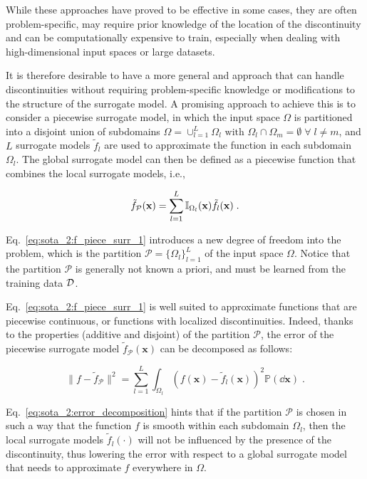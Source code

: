 \smallskip
While these approaches have proved to be effective in some cases, they are often problem-specific, may require prior knowledge of the location of the discontinuity and can be computationally expensive to train, especially when dealing with high-dimensional input spaces or large datasets. 

\smallskip
It is therefore desirable to have a more general and  approach that can handle discontinuities without requiring problem-specific knowledge or modifications to the structure of the surrogate model. A promising approach to achieve this is to consider a piecewise surrogate model, in which the input space $\Omega$ is partitioned into a disjoint union of subdomains $\Omega = \cup_{l=1}^L \Omega_l \text{ with } \Omega_l \cap \Omega_m = \emptyset \;\forall\; l \neq m$, and $L$ surrogate models $\tilde{f}_l$ are used to approximate the function in each subdomain $\Omega_l$. The global surrogate model can then be defined as a piecewise function that combines the local surrogate models, i.e.,

\begin{equation}
    \tilde{f}_{\mathcal{P}}(\mathbf{x}) = \sum_{l=1}^{L} \mathbb{I}_{\Omega_l}(\mathbf{x}) \tilde{f}_l(\mathbf{x}) \;.
    \label{eq:sota_2:f_piece_surr_1}
\end{equation}

Eq.~\eqref{eq:sota_2:f_piece_surr_1} introduces a new degree of freedom into the problem, which is the partition $\mathcal{P} = \{\Omega_l\}_{l=1}^L$ of the input space $\Omega$. Notice that the partition $\mathcal{P}$ is generally not known a priori, and must be learned from the training data $\mathcal{D}$.

\smallskip
Eq.~\eqref{eq:sota_2:f_piece_surr_1} is well suited to approximate functions that are piecewise continuous, or functions with localized discontinuities. Indeed, thanks to the properties (additive and disjoint) of the partition $\mathcal{P}$, the error of the piecewise surrogate model $\tilde{f}_{\mathcal{P}}(\mathbf{x})$ can be decomposed as follows:

\begin{equation}
    \| f - \tilde{f}_{\mathcal{P}} \|^2 = \sum_{l=1}^L \int_{\Omega_l} \left(f(\mathbf{x}) - \tilde{f}_l(\mathbf{x})\right)^2 \mathbb{P}(\dd \mathbf{x})\;.
    \label{eq:sota_2:error_decomposition}
\end{equation}

Eq.~\eqref{eq:sota_2:error_decomposition} hints that if the partition $\mathcal{P}$ is chosen in such a way that the function $f$ is smooth within each subdomain $\Omega_l$, then the local surrogate models $\tilde{f}_l(\cdot)$ will not be influenced by the presence of the discontinuity, thus lowering the error with respect to a global surrogate model that needs to approximate $f$ everywhere in $\Omega$.

